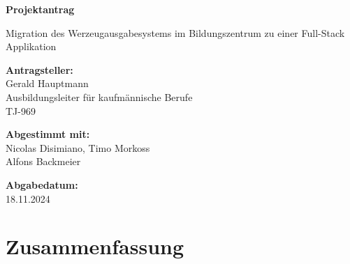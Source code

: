 \documentclass[a4paper, 12pt]{article}
\begin{document}
\begin{titlepage}
    \centering
    \vspace*{2cm}
    
    {\Huge \textbf{Projektantrag}}

    \vspace{.5cm}
    
    {\LARGE Migration des Werzeugausgabesystems im Bildungszentrum zu einer Full-Stack Applikation}
    
    \vspace{4cm}
    
    \textbf{Antragsteller:} \\
    Gerald Hauptmann \\
    Ausbildungsleiter für kaufmännische Berufe \\
    TJ-969
    
    \vspace{2cm}
    
    \textbf{Abgestimmt mit:} \\
    Nicolas Disimiano, Timo Morkoss \\
    Alfons Backmeier
    
    \vspace{2cm}
    
    \textbf{Abgabedatum:} \\
    18.11.2024
    
    \vfill
    \setcounter{page}{2}
\end{titlepage}


\tableofcontents

\newpage

    
\section{Zusammenfassung}
\end{document}

